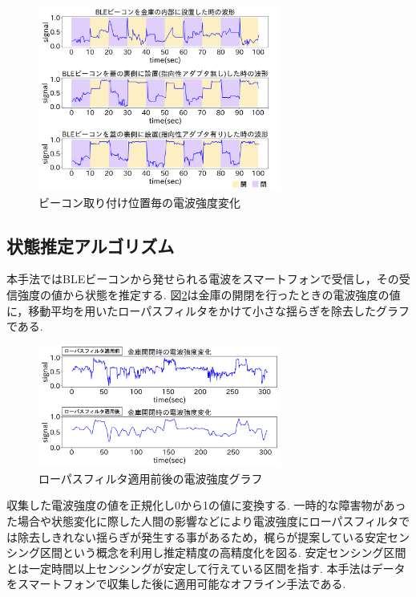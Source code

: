 \documentclass[Japanese]{dicomopapers}
\begin{document}
\begin{figure}[ht]
    \centering
    \includegraphics[width=8cm]{in-out.png}
    \caption{ビーコン取り付け位置毎の電波強度変化}
    \label{transform-data}
\end{figure}

\subsection{状態推定アルゴリズム}
本手法ではBLEビーコンから発せられる電波をスマートフォンで受信し，その受信強度の値から状態を推定する.
図\ref{bank-opcl}は金庫の開閉を行ったときの電波強度の値に，移動平均を用いたローパスフィルタをかけて小さな揺らぎを除去したグラフである.

\begin{figure}[t]
 \centering
 \includegraphics[width=8cm]{lowpath_compare.png}
 \caption{ローパスフィルタ適用前後の電波強度グラフ}
 \label{bank-opcl}
\end{figure}

収集した電波強度の値を正規化し0から1の値に変換する.
一時的な障害物があった場合や状態変化に際した人間の影響などにより電波強度にローパスフィルタでは除去しきれない揺らぎが発生する事があるため，梶ら\cite{sensing-area}が提案している安定センシング区間という概念を利用し推定精度の高精度化を図る.
安定センシング区間とは一定時間以上センシングが安定して行えている区間を指す.
本手法はデータをスマートフォンで収集した後に適用可能なオフライン手法である.
\end{document}
